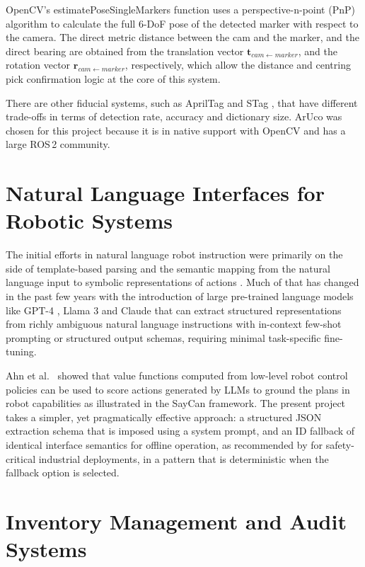 \documentclass[12pt,a4paper]{report}
\begin{document}
OpenCV's estimatePoseSingleMarkers function uses a perspective-n-point (PnP) algorithm \citep{lepetit2009} to calculate the full 6-DoF pose of the detected marker with respect to the camera. The direct metric distance between the cam and the marker, and the direct bearing are obtained from the translation vector $\mathbf{t}_{cam \leftarrow marker}$, and the rotation vector $\mathbf{r}_{cam \leftarrow marker}$, respectively, which allow the distance and centring pick confirmation logic at the core of this system.

There are other fiducial systems, such as AprilTag \citep{olson2011} and STag \citep{benligiray2019}, that have different trade-offs in terms of detection rate, accuracy and dictionary size. ArUco was chosen for this project because it is in native support with OpenCV and has a large ROS\,2 community.

\section{Natural Language Interfaces for Robotic Systems}

The initial efforts in natural language robot instruction were primarily on the side of template-based parsing and the semantic mapping from the natural language input to symbolic representations of actions \citep{tellex2011}. Much of that has changed in the past few years with the introduction of large pre-trained language models like GPT-4 \citep{openai2023}, Llama 3 \citep{meta2024} and Claude \citep{anthropic2024} that can extract structured representations from richly ambiguous natural language instructions with in-context few-shot prompting or structured output schemas, requiring minimal task-specific fine-tuning.

Ahn et al.\ \citep{ahn2022} showed that value functions computed from low-level robot control policies can be used to score actions generated by LLMs to ground the plans in robot capabilities as illustrated in the SayCan framework. The present project takes a simpler, yet pragmatically effective approach: a structured JSON extraction schema that is imposed using a system prompt, and an ID fallback of identical interface semantics for offline operation, as recommended by \citet{wake2023} for safety-critical industrial deployments, in a pattern that is deterministic when the fallback option is selected.

\section{Inventory Management and Audit Systems}
\end{document}
